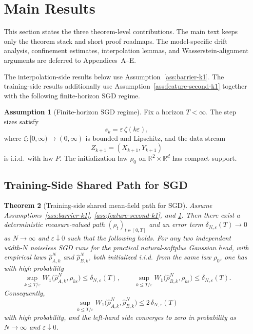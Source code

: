 \documentclass[11pt]{article}
\newtheorem{theorem}{Theorem}
\theoremstyle{definition}
\newtheorem{assumption}[theorem]{Assumption}
\newcommand{\R}{\mathbb{R}}
\begin{document}
\section{Main Results}

This section states the three theorem-level contributions. The main text keeps
only the theorem stack and short proof roadmaps. The model-specific drift
analysis, confinement estimates, interpolation lemmas, and Wasserstein-alignment
arguments are deferred to Appendices~A--E.

The interpolation-side results below use Assumption~\ref{ass:barrier-k1}. The
training-side results additionally use
Assumption~\ref{ass:feature-second-k1} together with the following
finite-horizon SGD regime.

\begin{assumption}[Finite-horizon SGD regime]
\label{ass:softplus-sgd-k1}
Fix a horizon $T<\infty$. The step sizes satisfy
\[
  s_k=\varepsilon\,\zeta(k\varepsilon),
\]
where $\zeta:[0,\infty)\to(0,\infty)$ is bounded and Lipschitz, and the data
stream
\[
  Z_{k+1}=(X_{k+1},Y_{k+1})
\]
is i.i.d.\ with law $P$. The initialization law $\rho_0$ on
$\R^2\times\R^d$ has compact support.
\end{assumption}

\subsection{Training-Side Shared Path for SGD}

\begin{theorem}[Training-side shared mean-field path for SGD]
\label{thm:main-shared-path-k1}
Assume Assumptions~\ref{ass:barrier-k1}, \ref{ass:feature-second-k1}, and
\ref{ass:softplus-sgd-k1}. Then there exist a deterministic measure-valued path
$(\rho_t)_{t\in[0,T]}$ and an error term
$\delta_{N,\varepsilon}(T)\to 0$ as $N\to\infty$ and $\varepsilon\downarrow 0$
such that the following holds. For any two independent width-$N$ noiseless SGD
runs for the practical natural-softplus Gaussian head, with empirical laws
$\hat\rho_{A,k}^N$ and $\hat\rho_{B,k}^N$, both initialized i.i.d.\ from the
same law $\rho_0$, one has with high probability
\[
  \sup_{k\le T/\varepsilon}
  W_1\!\bigl(\hat\rho_{A,k}^N,\rho_{k\varepsilon}\bigr)
  \le
  \delta_{N,\varepsilon}(T),
  \qquad
  \sup_{k\le T/\varepsilon}
  W_1\!\bigl(\hat\rho_{B,k}^N,\rho_{k\varepsilon}\bigr)
  \le
  \delta_{N,\varepsilon}(T).
\]
Consequently,
\[
  \sup_{k\le T/\varepsilon}
  W_1\!\bigl(\hat\rho_{A,k}^N,\hat\rho_{B,k}^N\bigr)
  \le
  2\,\delta_{N,\varepsilon}(T)
\]
with high probability, and the left-hand side converges to zero in probability
as $N\to\infty$ and $\varepsilon\downarrow 0$.
\end{theorem}
\end{document}
